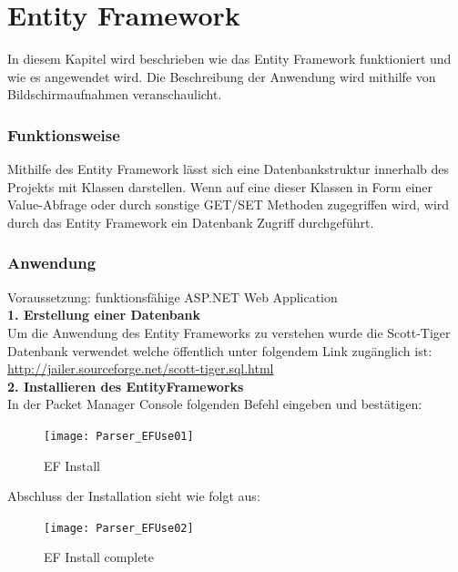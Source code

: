 \section{Entity Framework}
\label{sec:parser-entity-framework}
In diesem Kapitel wird beschrieben wie das Entity Framework funktioniert und wie es angewendet wird. Die  Beschreibung der Anwendung wird mithilfe von Bildschirmaufnahmen veranschaulicht. 
\subsubsection {Funktionsweise}
Mithilfe des Entity Framework lässt sich eine Datenbankstruktur innerhalb des Projekts mit Klassen darstellen. Wenn auf eine dieser Klassen in Form einer Value-Abfrage oder durch sonstige GET/SET Methoden zugegriffen wird, wird durch das Entity Framework ein Datenbank Zugriff durchgeführt. 
\subsubsection {Anwendung}
Voraussetzung: funktionsfähige ASP.NET Web Application \\
\break \textbf{1. Erstellung einer Datenbank} \\
Um die Anwendung des Entity Frameworks zu verstehen wurde die Scott-Tiger Datenbank verwendet welche öffentlich unter folgendem Link zugänglich ist: \url{http://jailer.sourceforge.net/scott-tiger.sql.html} \\
\break \textbf{2. Installieren des EntityFrameworks} \\
In der Packet Manager Console folgenden Befehl eingeben und bestätigen: 
\begin{figure}[H]
	\centering
    \texttt{[image: Parser\_EFUse01]}
    \caption{EF Install}
    \label{fig:parsef01}
\end{figure}
Abschluss der Installation sieht wie folgt aus:
\begin{figure}[H]
    \texttt{[image: Parser\_EFUse02]}
    \caption{EF Install complete}
    \label{fig:parsef02}
\end{figure} 

